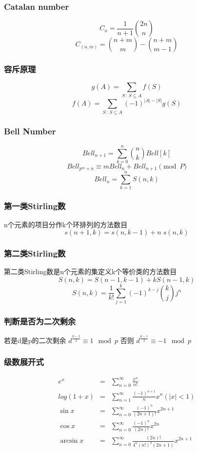 \subsubsection{Catalan number}
\[ C_n = \frac{1}{n+1}{2n \choose n} \]
\[ C_{(n,m)} = {n+m \choose m} - {n+m \choose m-1} \]
\subsubsection{容斥原理}
\[ g(A)=\sum_{S\,:\,S\subseteq A}f(S) \]
\[ f(A)=\sum_{S\,:\,S\subseteq A}(-1)^{\left|A\right|-\left|S\right|}g(S) \]
\subsubsection{Bell Number}
\[Bell_{n+1} = \sum\limits_{k=0}^n {n\choose k} Bell[k] \]
\[Bell_{p^m+n} \equiv mBell_{n} + Bell_{n+1} \pmod P\]
\[Bell_n = \sum\limits_{k=1}^{n} S(n,k) \]
\subsubsection{第一类Stirling数}
n个元素的项目分作k个环排列的方法数目
\[s(n+1,k)=s(n,k-1) + n \; s(n,k) \]
\subsubsection{第二类Stirling数}
第二类Stirling数是n个元素的集定义k个等价类的方法数目
\[S(n,k) = S(n-1,k-1) + k S(n-1,k)\]
\[S(n,k) =\frac{1}{k!}\sum_{j=1}^{k}(-1)^{k-j} {k\choose j} j^n \]
\subsubsection{判断是否为二次剩余}
若是d是p的二次剩余 $ d^{\frac{p-1}{2}} \equiv 1 \mod p $
否则 $ d^{\frac{p-1}{2}} \equiv -1 \mod p $
\subsubsection{级数展开式}
\begin{eqnarray*}
	e^x &=& \sum\limits_{n=0}^{\infty} \frac{x^n}{n!} \\
	log(1+x) &=& \sum\limits_{n=1}^{\infty} \frac{(-1)^{n+1}}{n}x^n (|x| < 1) \\
	\sin x &=& \sum\limits_{n=0}^{\infty} \frac{(-1)^n}{(2n+1)!}x^{2n+1} \\
	\cos x &=& \sum\limits_{n=0}^{\infty} \frac{(-1)^n}{(2n)!}x^{2n} \\
	\arcsin x &=& \sum\limits_{n=0}^{\infty} \frac{(2n)!}{4^n(n!)^2(2n+1)} x^{2n+1}
\end{eqnarray*} 
